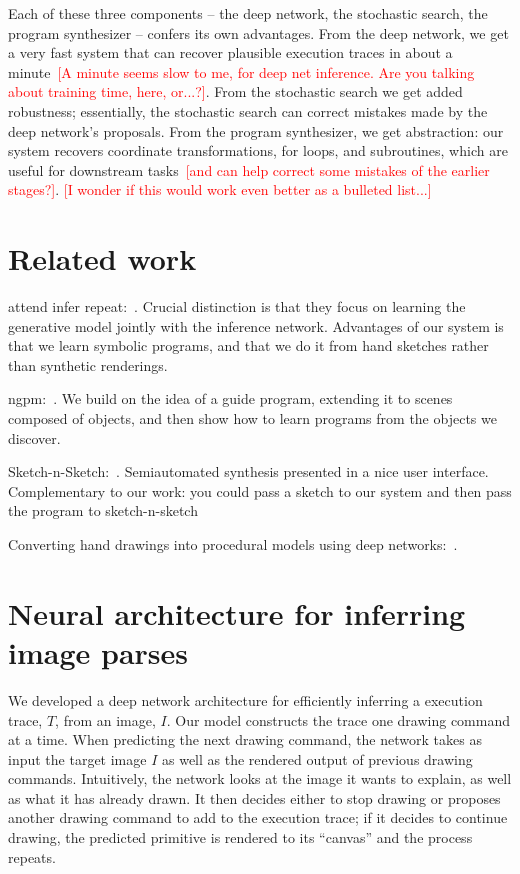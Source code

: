 \documentclass{article}
\newcommand{\remark}[1]{\textcolor{red}{[#1]}}
\begin{document}
Each of these three components -- the deep network, the stochastic
search, the program synthesizer -- confers its own advantages. From
the deep network, we get a very fast system that can recover plausible
execution traces in about a minute~\remark{A minute seems slow to me, for deep net inference. Are you talking about training time, here, or...?}. From the stochastic search we get
added robustness; essentially, the stochastic search can correct
mistakes made by the deep network's proposals.  From the program
synthesizer, we get abstraction: our system recovers coordinate
transformations, for loops, and subroutines, which are useful for
downstream tasks~\remark{and can help correct some mistakes of the earlier stages?}.
\remark{I wonder if this would work even better as a bulleted list...}


\section{Related work}
attend infer repeat:~\cite{eslami1603attend}. Crucial distinction is
that they focus on learning the generative model jointly with the
inference network. Advantages of our system is that we learn symbolic
programs, and that we do it from hand sketches rather than synthetic
renderings.

ngpm:~\cite{ritchie2016neurally}. We build on the idea of a guide program, extending it to scenes composed of objects, and then show how to learn programs from the objects we discover.

Sketch-n-Sketch:~\cite{Hempel:2016:SSP:2984511.2984575}. Semiautomated synthesis presented in a nice user interface. Complementary to our work: you could pass a sketch to our system and then pass the program to sketch-n-sketch


Converting hand drawings into procedural models using deep networks:~\cite{huang2017shape,Nishida:2016:ISU:2897824.2925951}.



\section{Neural architecture for inferring image parses}

We developed a deep network architecture for efficiently inferring a
execution trace, $T$, from an image, $I$.  Our model constructs the
trace one drawing command at a time.  When predicting the next drawing
command, the network takes as input the target image $I$ as well as
the rendered output of previous drawing commands.  Intuitively, the
network looks at the image it wants to explain, as well as what it has
already drawn.  It then decides either to stop drawing or proposes
another drawing command to add to the execution trace; if it decides
to continue drawing, the predicted primitive is rendered to its
``canvas'' and the process repeats.
\end{document}
